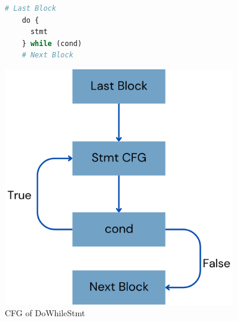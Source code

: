 \begin{figure}
  \centering
  \begin{minipage}{0.45\textwidth}
    \begin{lstlisting}[language=python]
    # Last Block
    do {
      stmt
    } while (cond)
    # Next Block
    \end{lstlisting}
  \end{minipage}%
  \hfill
  \begin{minipage}{0.45\textwidth}
    \centering
    \includegraphics[width=0.9\textwidth]{img/dowhilestmt-cfg.png}
  \end{minipage}
  \caption{CFG of DoWhileStmt}
\end{figure}


